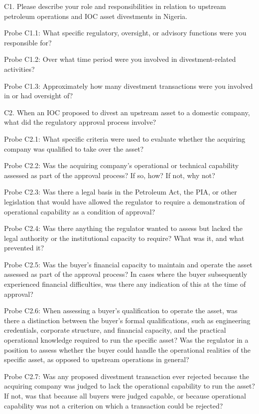 C1. Please describe your role and responsibilities in relation to
upstream petroleum operations and IOC asset divestments in Nigeria.

Probe C1.1: What specific regulatory, oversight, or advisory functions
were you responsible for?

Probe C1.2: Over what time period were you involved in
divestment-related activities?

Probe C1.3: Approximately how many divestment transactions were you
involved in or had oversight of?

C2. When an IOC proposed to divest an upstream asset to a domestic
company, what did the regulatory approval process involve?

Probe C2.1: What specific criteria were used to evaluate whether the
acquiring company was qualified to take over the asset?

Probe C2.2: Was the acquiring company's operational or technical
capability assessed as part of the approval process? If so, how? If not,
why not?

Probe C2.3: Was there a legal basis in the Petroleum Act, the PIA, or
other legislation that would have allowed the regulator to require a
demonstration of operational capability as a condition of approval?

Probe C2.4: Was there anything the regulator wanted to assess but lacked
the legal authority or the institutional capacity to require? What was
it, and what prevented it?

Probe C2.5: Was the buyer's financial capacity to maintain and operate
the asset assessed as part of the approval process? In cases where the
buyer subsequently experienced financial difficulties, was there any
indication of this at the time of approval?

Probe C2.6: When assessing a buyer's qualification to operate the asset,
was there a distinction between the buyer's formal qualifications, such
as engineering credentials, corporate structure, and financial capacity,
and the practical operational knowledge required to run the specific
asset? Was the regulator in a position to assess whether the buyer could
handle the operational realities of the specific asset, as opposed to
upstream operations in general?

Probe C2.7: Was any proposed divestment transaction ever rejected
because the acquiring company was judged to lack the operational
capability to run the asset? If not, was that because all buyers were
judged capable, or because operational capability was not a criterion on
which a transaction could be rejected?

